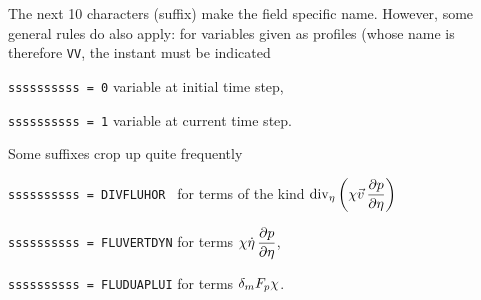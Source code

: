 The next 10 characters (suffix) make the field specific name. However, some general rules do also apply: for variables given as profiles (whose name is therefore {\tt VV}, the instant must be indicated

{\tt ssssssssss = 0} \qquad variable at initial time step,

{\tt ssssssssss = 1} \qquad variable at current time step.

\ms

Some suffixes crop up quite frequently 

{\tt ssssssssss = DIVFLUHOR } \qquad for terms of the kind $\displaystyle \mathop{\rm div}\nolimits_{\eta} \left( \chi \vec v \,\frac{\displaystyle \partial p}{\displaystyle \partial \eta} \right)$

{\tt ssssssssss = FLUVERTDYN} \qquad for terms $\displaystyle \chi \dot\eta\,\frac{\displaystyle \partial p}{\displaystyle \partial \eta}$,

{\tt ssssssssss = FLUDUAPLUI} \qquad for terms $\displaystyle \delta_m F_{p} \chi$.



